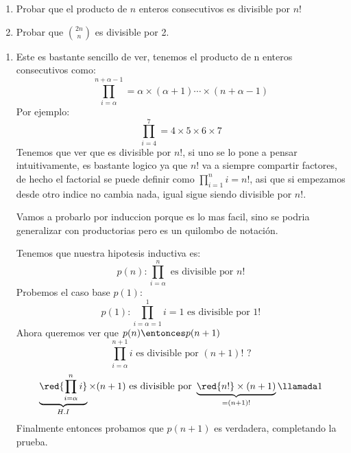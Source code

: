 \begin{enunciado}{\ejercicio}
        \begin{enumerate}[label=\alph*)] 
         \item Probar que el producto de $n$ enteros consecutivos es divisible por $n!$ 
         \item Probar que $\binom{2n}{n}$ es divisible por 2.
         \end{enumerate}
\end{enunciado}

\begin{enumerate}[label=\alph*)]
        \item 
                Este es bastante sencillo de ver, tenemos el producto de n enteros consecutivos como:
                \[\prod_{i=\alpha}^{n + \alpha - 1} = \alpha \times (\alpha + 1)\cdots \times (n + \alpha - 1)\]
                Por ejemplo:
                \[\prod_{i=4}^{7} = 4\times5\times6\times7\]
                Tenemos que ver que es divisible por $n!$, si uno se lo pone a pensar intuitivamente, es bastante logico
                ya que $n!$ va a siempre compartir factores, de hecho el factorial se puede definir como $\prod_{i=1}^{n} i = n!$, asi que 
                si empezamos desde otro indice no cambia nada, igual sigue siendo divisible por $n!$. 

                Vamos a probarlo por induccion porque es lo mas facil, sino se podria generalizar con productorias pero es un quilombo de notación.\par   
                Tenemos que nuestra hipotesis inductiva es: 
                \[p(n):\prod_{i=\alpha}^{n} \text{ es divisible por } n!\]
                Probemos el caso base $p(1)$:
                \[p(1): \prod_{i=\alpha=1}^{1} i = 1 \text{ es divisible por 1!}\]
                Ahora queremos ver que $p(n) \entonces p(n+1)$
                \[\prod_{i=\alpha}^{n+1} i \text { es divisible por $(n+1)!$ ?}\]
                \[\underbrace{\red{\prod_{i=\alpha}^{n} i}}_{H.I} \times (n+1) \text{ es divisible por } \underbrace{\red{n!} \times (n+1)}_{=(n+1)!} \llamada1 \]
                Finalmente entonces probamos que $p(n+1)$ es verdadera, completando la prueba.  
                

\end{enumerate}
